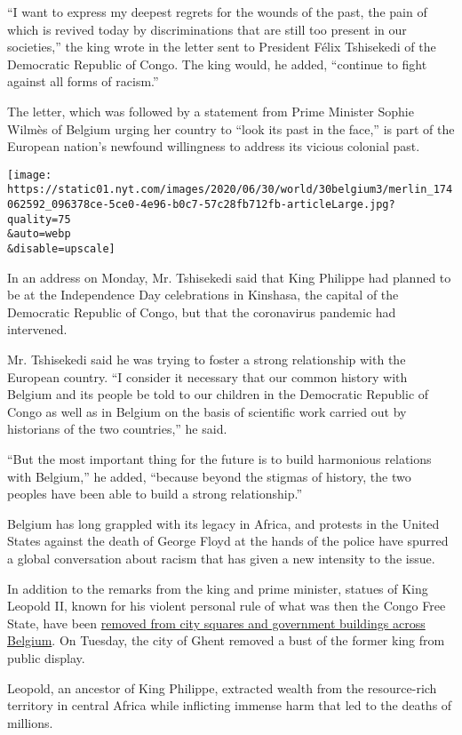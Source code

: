 ``I want to express my deepest regrets for the wounds of the past, the
pain of which is revived today by discriminations that are still too
present in our societies,'' the king wrote in the letter sent to
President Félix Tshisekedi of the Democratic Republic of Congo. The king
would, he added, ``continue to fight against all forms of racism.''

The letter, which was followed by a statement from Prime Minister Sophie
Wilmès of Belgium urging her country to ``look its past in the face,''
is part of the European nation's newfound willingness to address its
vicious colonial past.

\texttt{[image: https://static01.nyt.com/images/2020/06/30/world/30belgium3/merlin\_174062592\_096378ce-5ce0-4e96-b0c7-57c28fb712fb-articleLarge.jpg?quality=75\\\&auto=webp\\\&disable=upscale]}

In an address on Monday, Mr. Tshisekedi said that King Philippe had
planned to be at the Independence Day celebrations in Kinshasa, the
capital of the Democratic Republic of Congo, but that the coronavirus
pandemic had intervened.

Mr. Tshisekedi said he was trying to foster a strong relationship with
the European country. ``I consider it necessary that our common history
with Belgium and its people be told to our children in the Democratic
Republic of Congo as well as in Belgium on the basis of scientific work
carried out by historians of the two countries,'' he said.

``But the most important thing for the future is to build harmonious
relations with Belgium,'' he added, ``because beyond the stigmas of
history, the two peoples have been able to build a strong
relationship.''

Belgium has long grappled with its legacy in Africa, and protests in the
United States against the death of George Floyd at the hands of the
police have spurred a global conversation about racism that has given a
new intensity to the issue.

In addition to the remarks from the king and prime minister, statues of
King Leopold II, known for his violent personal rule of what was then
the Congo Free State, have been
\href{https://www.nytimes.com/2020/06/09/world/europe/king-leopold-statue-antwerp.html}{removed
from city squares and government buildings across Belgium}. On Tuesday,
the city of Ghent removed a bust of the former king from public display.

Leopold, an ancestor of King Philippe, extracted wealth from the
resource-rich territory in central Africa while inflicting immense harm
that led to the deaths of millions.

